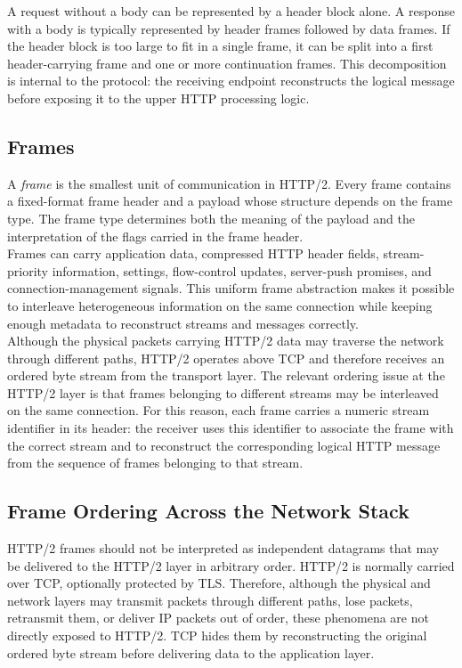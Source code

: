\documentclass{scrbook}
\begin{document}
A request without a body can be represented by a header block alone. A response with a body is typically represented by header frames followed by data frames. If the header block is too large to fit in a single frame, it can be split into a first header-carrying frame and one or more continuation frames. This decomposition is internal to the protocol: the receiving endpoint reconstructs the logical message before exposing it to the upper HTTP processing logic.

\subsection{Frames}

A \emph{frame} is the smallest unit of communication in HTTP/2. Every frame contains a fixed-format frame header and a payload whose structure depends on the frame type. The frame type determines both the meaning of the payload and the interpretation of the flags carried in the frame header.\\

Frames can carry application data, compressed HTTP header fields, stream-priority information, settings, flow-control updates, server-push promises, and connection-management signals. This uniform frame abstraction makes it possible to interleave heterogeneous information on the same connection while keeping enough metadata to reconstruct streams and messages correctly.\\

Although the physical packets carrying HTTP/2 data may traverse the network through different paths, HTTP/2 operates above TCP and therefore receives an ordered byte stream from the transport layer. The relevant ordering issue at the HTTP/2 layer is that frames belonging to different streams may be interleaved on the same connection. For this reason, each frame carries a numeric stream identifier in its header: the receiver uses this identifier to associate the frame with the correct stream and to reconstruct the corresponding logical HTTP message from the sequence of frames belonging to that stream.

\subsection{Frame Ordering Across the Network Stack}

HTTP/2 frames should not be interpreted as independent datagrams that may be delivered to the HTTP/2 layer in arbitrary order. HTTP/2 is normally carried over TCP, optionally protected by TLS. Therefore, although the physical and network layers may transmit packets through different paths, lose packets, retransmit them, or deliver IP packets out of order, these phenomena are not directly exposed to HTTP/2. TCP hides them by reconstructing the original ordered byte stream before delivering data to the application layer.\\
\end{document}
